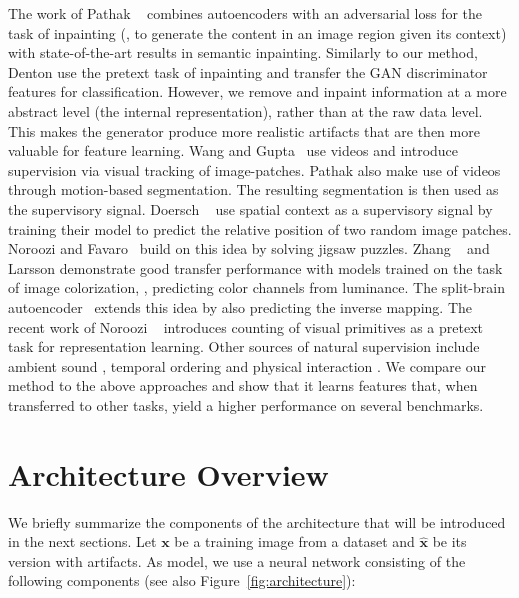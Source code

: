 \documentclass[10pt,twocolumn,letterpaper]{article}
\begin{document}
The work of Pathak \etal~\cite{pathak2016context} combines autoencoders with an adversarial loss for the task of inpainting (\ie, to generate the content in an image region given its context) with state-of-the-art results in semantic inpainting. Similarly to our method, Denton \etal \cite{denton2016semi} use the pretext task of inpainting and transfer the GAN discriminator features for classification. However, we remove and inpaint information at a more abstract level (the internal representation), rather than at the raw data level. This makes the generator produce more realistic artifacts that are then more valuable for feature learning. Wang and Gupta~\cite{wang2015unsupervised} use videos and introduce supervision via visual tracking of image-patches. Pathak \etal \cite{pathakCVPR17learning} also make use of videos through motion-based segmentation. The resulting segmentation is then used as the supervisory signal. 
Doersch \etal~\cite{doersch2015unsupervised} use spatial context as a supervisory signal by training their model to predict the relative position of two random image patches.
Noroozi and Favaro~\cite{noroozi2016unsupervised} build on this idea by solving jigsaw puzzles.
Zhang \etal~\cite{zhang2016colorful} and Larsson \etal \cite{larsson2017colorproxy} demonstrate good transfer performance with models trained on the task of image colorization, \ie, predicting color channels from luminance. The split-brain autoencoder~\cite{zhang2016split} extends this idea by also predicting the inverse mapping.
The recent work of Noroozi \etal~\cite{noroozi2017representation} introduces counting of visual primitives as a pretext task for representation learning. Other sources of natural supervision include ambient sound \cite{owens2016ambient}, temporal ordering \cite{misra2016shuffle} and physical interaction \cite{pinto2016curious}. 
We compare our method to the above approaches and show that it learns features that, when transferred to other tasks, yield a higher performance on several benchmarks.




\section{Architecture Overview}

We briefly summarize the components of the architecture that will be introduced in the next sections.
Let $\mathbf{x}$ be a training image from a dataset and $\hat{\mathbf{x}}$ be its version with artifacts. %
As model, we use a neural network consisting of the following components (see also Figure~\ref{fig:architecture}):
\end{document}
